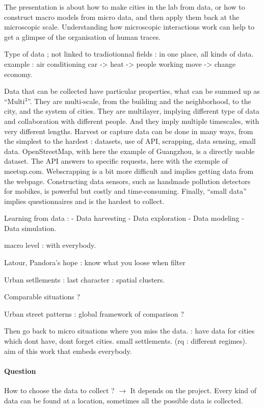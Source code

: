 \documentclass[11pt]{article}
\begin{document}
The presentation is about how to make cities in the lab from data, or how to construct macro models from micro data, and then apply them back at the microscopic scale. Understanding how microscopic interactions work can help to get a glimpse of the organisation of human traces.


Type of data ; not linked to tradiotionnal fields : in one place, all kinds of data. example : air conditioning car -> heat -> people working move -> change economy.

Data that can be collected have particular properties, what can be summed up as ``Multi$^3$''. They are multi-scale, from the building and the neighborhood, to the city, and the system of cities. They are multilayer, implying different type of data and collaboration with different people. And they imply multiple timescales, with very different lengths. Harvest or capture data can be done in many ways, from the simplest to the hardest : datasets, use of API, scrapping, data sensing, small data. OpenStreetMap, with here the example of Guangzhou, is a directly usable dataset. The API answers to specific requests, here with the exemple of meetup.com. Webscrapping is a bit more difficult and implies getting data from the webpage. Constructing data sensors, such as handmade pollution detectors for mobikes, is powerful but costly and time-consuming. Finally, ``small data'' implies questionnaires and is the hardest to collect.


Learning from data : 
 - Data harvesting
 - Data exploration
 - Data modeling
 - Data simulation.
 
macro level : with everybody.

Latour, Pandora's hope : know what you loose when filter

Urban setllements : last character : spatial clusters.

Comparable situations ?

Urban street patterns : global framework of comparison ?

Then go back to micro situations where you miss the data. : have data for cities which dont have, dont forget cities. small settlements. (rq : different regimes).
aim of this work that embeds everybody.


\paragraph{Question} 

How to choose the data to collect ? $\rightarrow$ It depends on the project. Every kind of data can be found at a location, sometimes all the possible data is collected.
\end{document}
